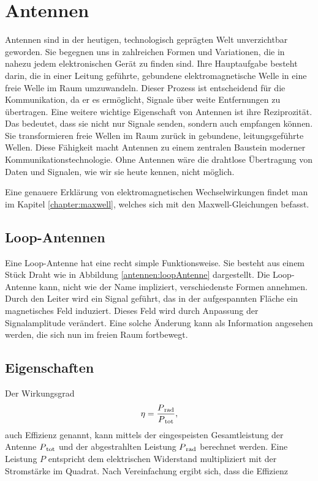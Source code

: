%
%
% 
%
%

\section{Antennen\label{antennen:antennenAllgemein}}


Antennen sind in der heutigen, technologisch geprägten Welt unverzichtbar geworden. Sie begegnen uns in zahlreichen Formen und Variationen, die in nahezu jedem elektronischen Gerät zu finden sind. Ihre Hauptaufgabe besteht darin, die in einer Leitung geführte, gebundene elektromagnetische Welle in eine freie Welle im Raum umzuwandeln. Dieser Prozess ist entscheidend für die Kommunikation, da er es ermöglicht, Signale über weite Entfernungen zu übertragen. Eine weitere wichtige Eigenschaft von Antennen ist ihre Reziprozität. Das bedeutet, dass sie nicht nur Signale senden, sondern auch empfangen können. Sie transformieren freie Wellen im Raum zurück in gebundene, leitungsgeführte Wellen. Diese Fähigkeit macht Antennen zu einem zentralen Baustein moderner Kommunikationstechnologie. Ohne Antennen wäre die drahtlose Übertragung von Daten und Signalen, wie wir sie heute kennen, nicht möglich.

Eine genauere Erklärung von elektromagnetischen Wechselwirkungen findet man im Kapitel \ref{chapter:maxwell},
welches sich mit den Maxwell-Gleichungen befasst. 
\subsection{Loop-Antennen\label{antennen:antennenAllgemein_loop}}


Eine Loop-Antenne hat eine recht simple Funktionsweise. Sie besteht aus einem Stück Draht wie in Abbildung \ref{antennen:loopAntenne} dargestellt. Die Loop-Antenne kann, nicht wie der Name impliziert, verschiedenste Formen annehmen. Durch den Leiter wird ein Signal geführt, das in der aufgespannten Fläche ein magnetisches Feld induziert. Dieses Feld wird durch Anpassung der Signalamplitude verändert. Eine solche Änderung kann als Information angesehen werden, die sich nun im freien Raum fortbewegt.



\subsection{Eigenschaften\label{antennen:antennenEigenschaften}}
Der Wirkungsgrad
\begin{equation}
	\eta=\frac{P\textsubscript{rad}}{P\textsubscript{tot}},
	\label{antennen:Wirkungsgrad}
\end{equation}
auch Effizienz genannt, kann mittels der eingespeisten Gesamtleistung der Antenne $P\textsubscript{tot}$ und der abgestrahlten Leistung $P\textsubscript{rad}$ berechnet werden. Eine Leistung $P$ entspricht dem elektrischen Widerstand multipliziert mit der Stromstärke im Quadrat. Nach Vereinfachung ergibt sich, dass die Effizienz

